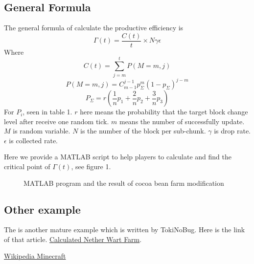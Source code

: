 \documentclass[UTF8,a4paper,15pt,titlepage,scale=0.8]{article}
\begin{document}
    \subsection{General Formula}
        The general formula of calculate the productive efficiency is
            \begin{equation}
                \Gamma (t) = \frac{C(t)}{t} \times N\gamma\epsilon
            \end{equation}
        Where 
            \begin{equation}
                C(t) = \sum_{j=m}^t P(M=m,j)
            \end{equation}
            \begin{equation}
                P(M=m,j) = C_{m-1}^{j-1} p_{\Sigma}^m(1-p_\Sigma)^{j-m}
            \end{equation}
            \begin{equation}
                P_{\Sigma} = r(\frac{1}{n}p_1 + \frac{2}{n}p_2 + \frac{3}{n}p_3)
            \end{equation}
        For $P_i$, seen in table 1. $r$ here means the probability that the target block change level after receive one random tick. $m$ means the number of successfully update. $M$ is random variable. $N$ is the number of the block per sub-chunk. $\gamma$ is drop rate. $\epsilon$ is collected rate.

        Here we provide a MATLAB script to help players to calculate and find the critical point of $\Gamma(t)$, see figure 1.
            \begin{figure}[H]
                \centering
                \caption{MATLAB program and the result of cocoa bean farm modification}
            \end{figure}
    \subsection{Other example}
        The is another mature example which is written by TokiNoBug. Here is the link of that article. \href{https://www.bilibili.com/read/cv8256187}{Calculated Nether Wart Farm}.

\begin{thebibliography}{99}
     \href{https://minecraft.fandom.com/wiki/Tick#Random_tick}{Wikipedia Minecraft}
\end{thebibliography}
\end{document}
